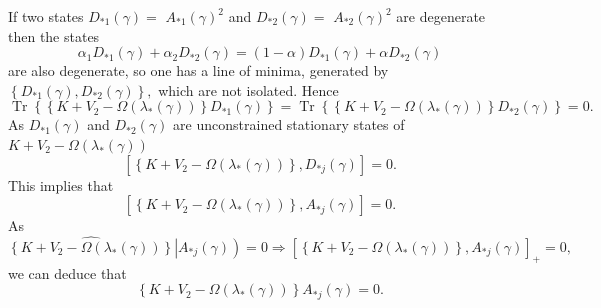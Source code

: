 \documentclass[aps,preprint]{revtex4}%
\begin{document}
If two states $D_{\ast1}\left(  \gamma\right)  =$ $A_{\ast1}\left(
\gamma\right)  ^{2}$ and $D_{\ast2}\left(  \gamma\right)  =$ $A_{\ast2}\left(
\gamma\right)  ^{2}$ are degenerate then the states
\begin{equation}
\alpha_{1}D_{\ast1}\left(  \gamma\right)  +\alpha_{2}D_{\ast2}\left(
\gamma\right)  =\left(  1-\alpha\right)  D_{\ast1}\left(  \gamma\right)
+\alpha D_{\ast2}\left(  \gamma\right)
\end{equation}
are also degenerate, so one has a line of minima, generated by $\left\{
D_{\ast1}\left(  \gamma\right)  ,D_{\ast2}\left(  \gamma\right)  \right\}  ,$
which are not isolated. Hence%
\begin{equation}
\operatorname{Tr}\left\{  \left\{  K+V_{2}-\Omega\left(  \lambda_{\ast}\left(
\gamma\right)  \right)  \right\}  D_{\ast1}\left(  \gamma\right)  \right\}
=\operatorname{Tr}\left\{  \left\{  K+V_{2}-\Omega\left(  \lambda_{\ast
}\left(  \gamma\right)  \right)  \right\}  D_{\ast2}\left(  \gamma\right)
\right\}  =0.
\end{equation}
As $D_{\ast1}\left(  \gamma\right)  $ and $D_{\ast2}\left(  \gamma\right)  $
are unconstrained stationary states of $K+V_{2}-\Omega\left(  \lambda_{\ast
}\left(  \gamma\right)  \right)  $
\begin{equation}
\left[  \left\{  K+V_{2}-\Omega\left(  \lambda_{\ast}\left(  \gamma\right)
\right)  \right\}  ,D_{\ast j}\left(  \gamma\right)  \right]  =0.
\end{equation}
This implies that
\begin{equation}
\left[  \left\{  K+V_{2}-\Omega\left(  \lambda_{\ast}\left(  \gamma\right)
\right)  \right\}  ,A_{\ast j}\left(  \gamma\right)  \right]  =0.
\end{equation}
As
\begin{equation}
\widehat{\left\{  K+V_{2}-\Omega\left(  \lambda_{\ast}\left(  \gamma\right)
\right)  \right\}  }\left\vert A_{\ast j}\left(  \gamma\right)  \right)
=0\Rightarrow\left[  \left\{  K+V_{2}-\Omega\left(  \lambda_{\ast}\left(
\gamma\right)  \right)  \right\}  ,A_{\ast j}\left(  \gamma\right)  \right]
_{+}=0,
\end{equation}
we can deduce that
\begin{equation}
\left\{  K+V_{2}-\Omega\left(  \lambda_{\ast}\left(  \gamma\right)  \right)
\right\}  A_{\ast j}\left(  \gamma\right)  =0.
\end{equation}
\end{document}
